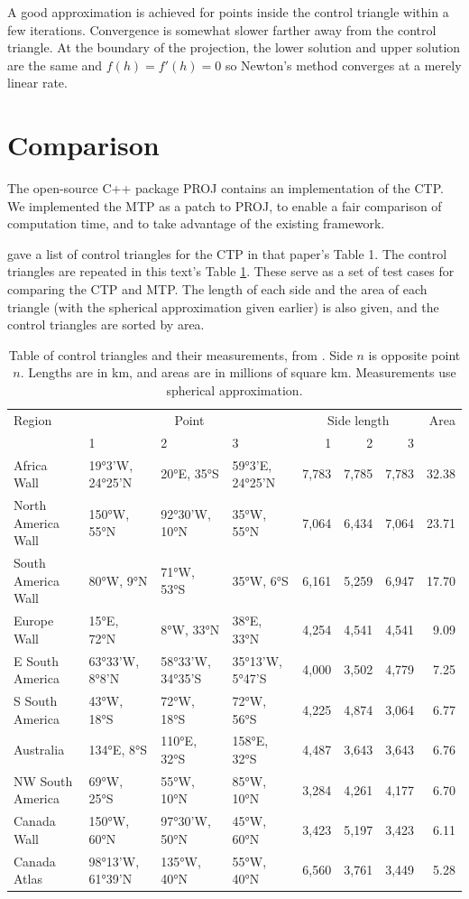 \documentclass[]{interact}
\begin{document}
A good approximation is achieved for points inside the control triangle within
a few iterations. Convergence is somewhat slower farther away from the
control triangle. At the boundary of the projection,
the lower solution and upper solution are the same and $f(h)=f'(h)=0$
so Newton's method converges at a merely linear rate. \citep{burden}

\section{Comparison}
The open-source C++ package PROJ \citep{proj} contains an implementation of the
CTP. We implemented the MTP as a patch to PROJ, to enable a fair comparison of
computation time, and to take advantage of the existing framework.

\citet{christensen} gave a list of control triangles for the CTP in that
paper's Table 1. The control triangles are repeated in this text's Table
\ref{table:ctrlpts}. These serve as a set of test cases for comparing the CTP
and MTP. The length of each side and the area of each triangle
(with the spherical approximation
given earlier) is also given, and the control triangles are sorted by area.

\begin{table}
\begin{tabular}{ p{2.5cm} | p{1.3cm} p{1.3cm} p{1.4cm} | r r r | r }
Region & \multicolumn{3}{c}{Point} &
  \multicolumn{3}{c}{Side length} &  Area \\
& 1 & 2 & 3 & 1 & 2 & 3 & \\
\hline
Africa Wall & 19°3'W, 24°25'N & 20°E, 35°S & 59°3'E, 24°25'N &
  7,783 & 7,785 & 7,783 & 32.38 \\
North \mbox{America} Wall & 150°W, 55°N & 92°30'W, 10°N & 35°W, 55°N &
  7,064 & 6,434 & 7,064 & 23.71 \\
South \mbox{America} Wall & 80°W, 9°N & 71°W, 53°S & 35°W, 6°S &
  6,161 & 5,259 & 6,947 & 17.70 \\
Europe Wall & 15°E, 72°N & 8°W, 33°N & 38°E, 33°N &
  4,254 & 4,541 & 4,541 & 9.09 \\
E South \mbox{America} & 63°33'W, 8°8'N & 58°33'W, 34°35'S & 35°13'W, 5°47'S &
  4,000 & 3,502 & 4,779 & 7.25 \\
S South \mbox{America} & 43°W, 18°S & 72°W, 18°S & 72°W, 56°S &
  4,225 & 4,874 & 3,064 & 6.77 \\
Australia & 134°E, 8°S & 110°E, 32°S & 158°E, 32°S &
  4,487 & 3,643 & 3,643 & 6.76 \\
NW South \mbox{America} & 69°W, 25°S & 55°W, 10°N & 85°W, 10°N &
  3,284 & 4,261 & 4,177 & 6.70 \\
Canada Wall & 150°W, 60°N & 97°30'W, 50°N & 45°W, 60°N &
  3,423 & 5,197 & 3,423 & 6.11 \\
Canada \mbox{Atlas} & 98°13'W, 61°39'N & 135°W, 40°N & 55°W, 40°N &
  6,560 & 3,761 & 3,449 & 5.28
\end{tabular}
\caption{Table of control triangles and their measurements, from
\citet{christensen}. Side $n$ is opposite point $n$. Lengths are in km,
and areas are in millions of square km.
Measurements use spherical approximation.}
\label{table:ctrlpts}
\end{table}
\end{document}
